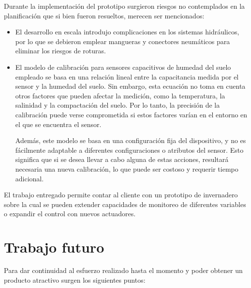 Durante la implementación del prototipo surgieron riesgos no contemplados en la planificación que si bien fueron resueltos, merecen ser mencionados:
\begin{itemize}
\item El desarrollo en escala introdujo complicaciones en los sistemas hidráulicos, por lo que se debieron emplear mangueras y conectores neumáticos para eliminar los riesgos de roturas.

\item El modelo de calibración para sensores capacitivos de humedad del suelo empleado \citep{soilcalibration} se basa en una relación lineal entre la capacitancia medida por el sensor y la humedad del suelo. Sin embargo, esta ecuación no toma en cuenta otros factores que pueden afectar la medición, como la temperatura, la salinidad y la compactación del suelo. Por lo tanto, la precisión de la calibración puede verse comprometida si estos factores varían en el entorno en el que se encuentra el sensor.

Además, este modelo se basa en una configuración fija del dispositivo, y no es fácilmente adaptable a diferentes configuraciones o atributos del sensor. Esto significa que si se desea llevar  a cabo alguna de estas acciones, resultará necesaria una nueva calibración, lo que puede ser costoso y requerir tiempo adicional.
\end{itemize}


El trabajo entregado permite contar al cliente con un prototipo de invernadero sobre la cual se pueden extender capacidades de monitoreo de diferentes variables o expandir el control con nuevos actuadores.







\section{Trabajo futuro}

Para dar continuidad al esfuerzo realizado hasta el momento y poder obtener un
producto atractivo surgen los siguientes puntos:

